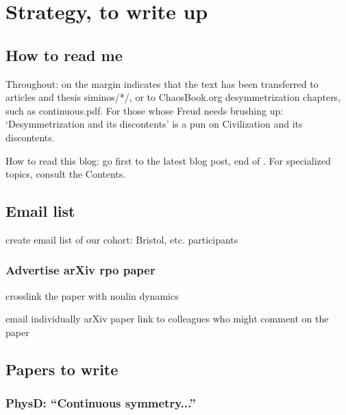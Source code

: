 
\chapter{Strategy, to write up}

\section{How to read me}

Throughout:  {\textdollar} on the margin
{\steady}
indicates that the text has been transferred to
articles and thesis siminos/*/,  or to ChaosBook.org desymmetrization
chapters, such as
{continuous.pdf}.
%
For those whose Freud needs brushing up:
`Desymmetrization and its discontents' is a pun
on 
{Civilization and its discontents}.

How to read this blog: go first to the latest blog post, end
of . For specialized topics, consult the
Contents.


\section{Email list}

create email list of our cohort:  Bristol, etc. participants

\subsection{Advertise arXiv rpo paper}

crosslink the paper with nonlin dynamics

email individually arXiv paper link to colleagues who might comment
    on the paper



\section{Papers to write}

\subsection{PhysD: ``Continuous symmetry...''}

\medskip{}

